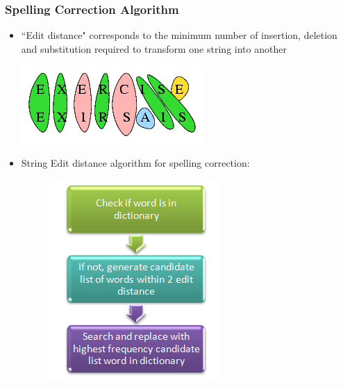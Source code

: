 \documentclass{beamer}
\begin{document}
\begin{frame}
\frametitle{Spelling Correction Algorithm}

\begin{itemize}
\item ``Edit distance" corresponds to the minimum number of insertion, deletion and substitution required to transform one string into another\\
\begin{center}
\includegraphics[scale=0.35]{images/edit2.png}
\end{center}
\item String Edit distance algorithm for spelling correction:
\begin{figure}[ht]
\begin{center}
\includegraphics[scale=0.5]{images/editdistance.png}
\end{center}
\end{figure}

\end{itemize}
\end{frame}
\end{document}
